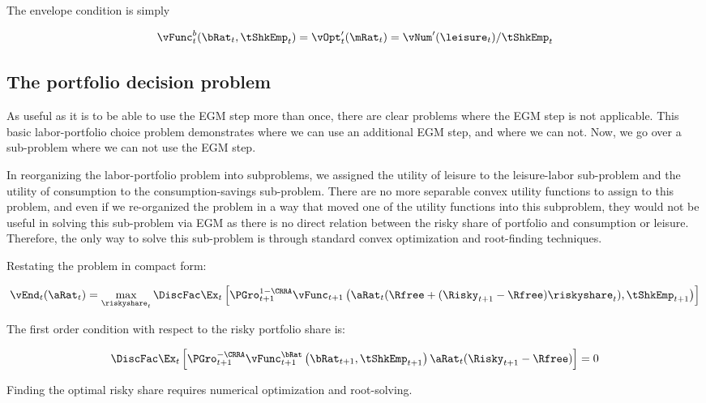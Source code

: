 \documentclass[\econtexRoot/SequentialEGM]{subfiles}
\begin{document}
The envelope condition is simply

\begin{equation}
        \vFunc_{t}^{b}(\bRat_{t}, \tShkEmp_{t}) = \vOpt_{t}'(\mRat_{t}) =
        \vNum'(\leisure_{t})/\tShkEmp_{t}
\end{equation}

\subsection{The portfolio decision problem}

As useful as it is to be able to use the EGM step more than once, there are clear problems where the EGM step is not applicable. This basic labor-portfolio choice problem demonstrates where we can use an additional EGM step, and where we can not. Now, we go over a sub-problem where we can not use the EGM step.

In reorganizing the labor-portfolio problem into subproblems, we assigned the utility of leisure to the leisure-labor sub-problem and the utility of consumption to the consumption-savings sub-problem. There are no more separable convex utility functions to assign to this problem, and even if we re-organized the problem in a way that moved one of the utility functions into this subproblem, they would not be useful in solving this sub-problem via EGM as there is no direct relation between the risky share of portfolio and consumption or leisure. Therefore, the only way to solve this sub-problem is through standard convex optimization and root-finding techniques.

Restating the problem in compact form:

\begin{equation}
        \vEnd_{t}(\aRat_{t}) = \max_{\riskyshare_{t}} \DiscFac \Ex_{t} \left[ \PGro_{t+1}^{1-\CRRA}
        \vFunc_{t+1}\left(\aRat_{t}(\Rfree + (\Risky_{t+1} - \Rfree) \riskyshare_{t}), \tShkEmp_{t+1}\right)
        \right]
\end{equation}

The first order condition with respect to the risky portfolio share is:

\begin{equation}
        \DiscFac \Ex_{t} \left[ \PGro_{t+1}^{-\CRRA} \vFunc_{t+1}^{\bRat}\left(\bRat_{t+1}, \tShkEmp_{t+1}\right) \aRat_{t}(\Risky_{t+1} - \Rfree)  \right] = 0
\end{equation}

Finding the optimal risky share requires numerical optimization and root-solving.
\end{document}
